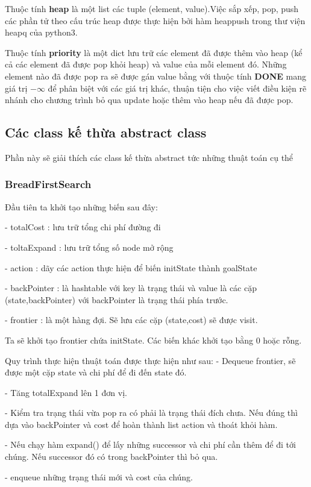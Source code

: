 \documentclass[11pt]{scrartcl} %
\begin{document}
Thuộc tính \textbf{heap} là một list các tuple (element, value).Việc sắp xếp, pop, push các phần tử theo cấu trúc heap được thực hiện bởi hàm heappush trong thư viện heapq của python3.

Thuộc tính \textbf{priority} là một dict lưu trữ các element đã được thêm vào heap (kể cả các element đã được pop khỏi heap) và value của mỗi element đó. Những element nào đã được pop ra sẽ được gán value bằng với thuộc tính \textbf{DONE} mang giá trị $- \infty$ để phân biệt với các giá trị khác, thuận tiện cho việc viết điều kiện rẽ nhánh cho chương trình bỏ qua update hoặc thêm vào heap nếu đã được pop.
\subsection{Các class kế thừa abstract class}
Phần này sẽ giải thích các class kế thừa abstract tức những thuật toán cụ thể
\subsubsection{BreadFirstSearch}
Đầu tiên ta khởi tạo những biến sau đây:  

- totalCost : lưu trữ tổng chi phí đường đi  

- toltaExpand : lưu trữ tổng số node mở rộng  

- action : dãy các action thực hiện để biến initState thành goalState  

- backPointer : là hashtable với key là trạng thái và value là các cặp (state,backPointer) với backPointer là trạng thái phía trước.  

- frontier : là một hàng đợi. Sẽ lưu các cặp (state,cost) sẽ được visit.  

Ta sẽ khởi tạo frontier chứa initState. Các biến khác khởi tạo bằng 0 hoặc rỗng.  

Quy trình thực hiện thuật toán được thực hiện như sau:
- Dequeue frontier, sẽ được một cặp state và chi phí để đi đến state đó.

- Tăng totalExpand lên 1 đơn vị.  

- Kiểm tra trạng thái vừa pop ra có phải là trạng thái đích chưa. Nếu đúng thì dựa vào backPointer và cost để hoàn thành list action và thoát khỏi hàm.  

- Nếu chạy hàm expand() để lấy những successor và chi phí cần thêm để đi tới chúng. Nếu successor đó có trong backPointer thì bỏ qua.

- enqueue những trạng thái mới và cost của chúng.
\end{document}
